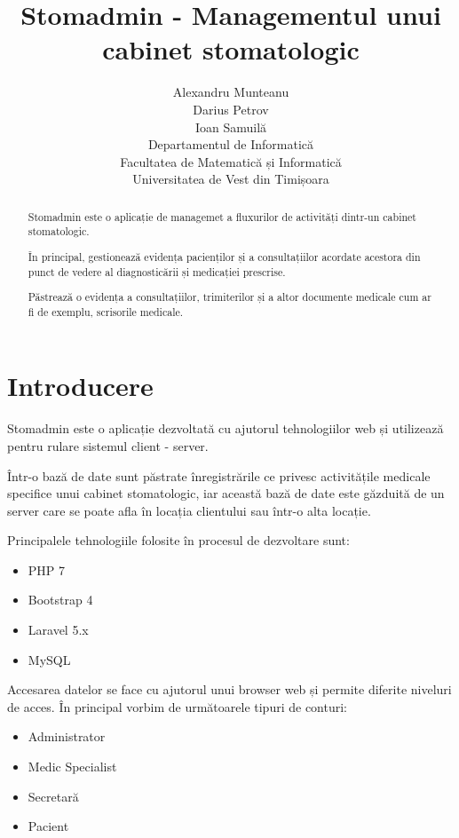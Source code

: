 \documentclass[a4paper,12pt]{article}
\title{Stomadmin - Managementul unui cabinet stomatologic}
\author{Alexandru Munteanu\\
Darius Petrov\\
Ioan Samuilă\\
Departamentul de Informatică\\
Facultatea de Matematică și Informatică\\
Universitatea de Vest din Timișoara}
\begin{document}
\maketitle
\begin{abstract}
Stomadmin este o aplicație de managemet a fluxurilor de activități dintr-un cabinet stomatologic.

 În principal, gestionează evidența pacienților și a consultațiilor acordate acestora din punct de vedere al diagnosticării și medicației prescrise. 

Păstrează o evidența a consultațiilor, trimiterilor și a altor documente medicale cum ar fi de exemplu, scrisorile medicale.  
\end{abstract}

\pagebreak

\tableofcontents

\pagebreak

\section{Introducere}

Stomadmin este o aplicație dezvoltată cu ajutorul tehnologiilor web și utilizează pentru rulare sistemul client - server.

Într-o bază de date sunt păstrate înregistrările ce privesc activitățile medicale specifice unui cabinet stomatologic, iar această bază de date este găzduită de un server care se poate afla în locația clientului sau într-o alta locație.

Principalele tehnologiile folosite în procesul de dezvoltare sunt:

\begin{itemize}
\item PHP 7
\item Bootstrap 4
\item Laravel 5.x
\item MySQL
\end{itemize}

Accesarea datelor se face cu ajutorul unui browser web și permite diferite niveluri de acces. În principal vorbim de următoarele tipuri de conturi:

\begin{itemize}
\item Administrator
\item Medic Specialist
\item Secretară
\item Pacient
\end{itemize} 
\end{document}
